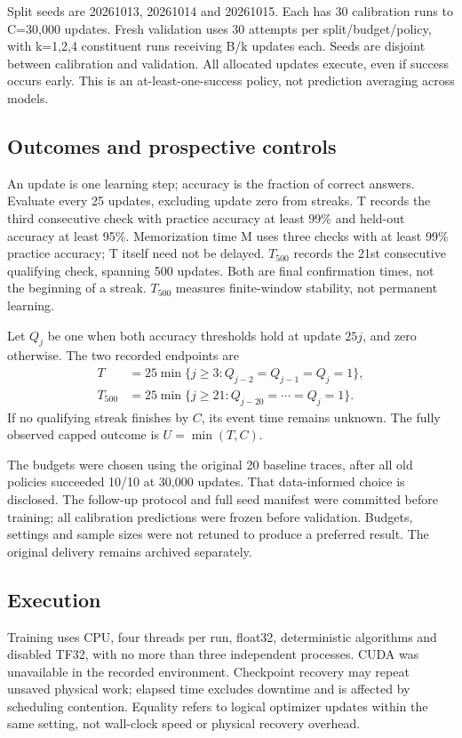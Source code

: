 \documentclass[conference,letterpaper]{IEEEtran}
\begin{document}
Split seeds are 20261013, 20261014 and 20261015. Each has 30 calibration runs to C=30,000 updates. Fresh validation uses 30 attempts per split/budget/policy, with k=1,2,4 constituent runs receiving B/k updates each. Seeds are disjoint between calibration and validation. All allocated updates execute, even if success occurs early. This is an at-least-one-success policy, not prediction averaging across models.

\subsection{Outcomes and prospective controls}

An update is one learning step; accuracy is the fraction of correct answers. Evaluate every 25 updates, excluding update zero from streaks. T records the third consecutive check with practice accuracy at least 99\% and held-out accuracy at least 95\%. Memorization time M uses three checks with at least 99\% practice accuracy; T itself need not be delayed. $T_{500}$ records the 21st consecutive qualifying check, spanning 500 updates. Both are final confirmation times, not the beginning of a streak. $T_{500}$ measures finite-window stability, not permanent learning.

Let $Q_j$ be one when both accuracy thresholds hold at update $25j$, and zero otherwise. The two recorded endpoints are
\begin{align}
T&=25\min\{j\geq3:Q_{j-2}=Q_{j-1}=Q_j=1\},\\
T_{500}&=25\min\{j\geq21:Q_{j-20}=\cdots=Q_j=1\}.
\end{align}
If no qualifying streak finishes by $C$, its event time remains unknown. The fully observed capped outcome is $U=\min(T,C)$.

The budgets were chosen using the original 20 baseline traces, after all old policies succeeded 10/10 at 30,000 updates. That data-informed choice is disclosed. The follow-up protocol and full seed manifest were committed before training; all calibration predictions were frozen before validation. Budgets, settings and sample sizes were not retuned to produce a preferred result. The original delivery remains archived separately.

\subsection{Execution}

Training uses CPU, four threads per run, float32, deterministic algorithms and disabled TF32, with no more than three independent processes. CUDA was unavailable in the recorded environment. Checkpoint recovery may repeat unsaved physical work; elapsed time excludes downtime and is affected by scheduling contention. Equality refers to logical optimizer updates within the same setting, not wall-clock speed or physical recovery overhead.
\end{document}
